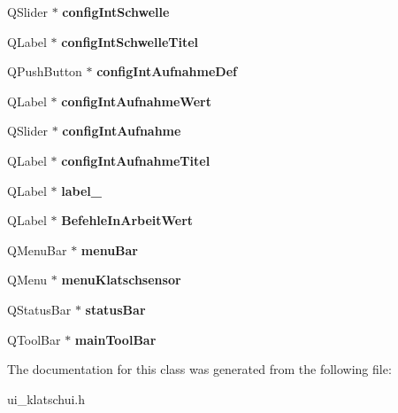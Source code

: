 \begin{DoxyCompactItemize}
\item 
Q\+Slider $\ast$ {\bfseries config\+Int\+Schwelle}\hypertarget{class_ui__klatschui_a73daca54782b978285cedba57e02f071}{}\label{class_ui__klatschui_a73daca54782b978285cedba57e02f071}

\item 
Q\+Label $\ast$ {\bfseries config\+Int\+Schwelle\+Titel}\hypertarget{class_ui__klatschui_aa08824169d30d8f9ee13f4dbb158a5b2}{}\label{class_ui__klatschui_aa08824169d30d8f9ee13f4dbb158a5b2}

\item 
Q\+Push\+Button $\ast$ {\bfseries config\+Int\+Aufnahme\+Def}\hypertarget{class_ui__klatschui_ab66c0fe9fd1385827a31f50492065117}{}\label{class_ui__klatschui_ab66c0fe9fd1385827a31f50492065117}

\item 
Q\+Label $\ast$ {\bfseries config\+Int\+Aufnahme\+Wert}\hypertarget{class_ui__klatschui_abdf48db3c443a83132ee9144d0573480}{}\label{class_ui__klatschui_abdf48db3c443a83132ee9144d0573480}

\item 
Q\+Slider $\ast$ {\bfseries config\+Int\+Aufnahme}\hypertarget{class_ui__klatschui_acf0b144064081db4d375f2fcc08ae91b}{}\label{class_ui__klatschui_acf0b144064081db4d375f2fcc08ae91b}

\item 
Q\+Label $\ast$ {\bfseries config\+Int\+Aufnahme\+Titel}\hypertarget{class_ui__klatschui_a14334201f46e35ecdc1cd61074978685}{}\label{class_ui__klatschui_a14334201f46e35ecdc1cd61074978685}

\item 
Q\+Label $\ast$ {\bfseries label\+\_}\hypertarget{class_ui__klatschui_a8077382b3f93d77f2d6eb40c473e3805}{}\label{class_ui__klatschui_a8077382b3f93d77f2d6eb40c473e3805}

\item 
Q\+Label $\ast$ {\bfseries Befehle\+In\+Arbeit\+Wert}\hypertarget{class_ui__klatschui_a6c4f6eafadc2089ff5eb1f769e184fa5}{}\label{class_ui__klatschui_a6c4f6eafadc2089ff5eb1f769e184fa5}

\item 
Q\+Menu\+Bar $\ast$ {\bfseries menu\+Bar}\hypertarget{class_ui__klatschui_a4c61eeaf10e215e589f094e48ab9de8a}{}\label{class_ui__klatschui_a4c61eeaf10e215e589f094e48ab9de8a}

\item 
Q\+Menu $\ast$ {\bfseries menu\+Klatschsensor}\hypertarget{class_ui__klatschui_aa1dc227cca7eee569e90f07875fcd523}{}\label{class_ui__klatschui_aa1dc227cca7eee569e90f07875fcd523}

\item 
Q\+Status\+Bar $\ast$ {\bfseries status\+Bar}\hypertarget{class_ui__klatschui_aa052a6c753834e52b2ed359ec4c2f474}{}\label{class_ui__klatschui_aa052a6c753834e52b2ed359ec4c2f474}

\item 
Q\+Tool\+Bar $\ast$ {\bfseries main\+Tool\+Bar}\hypertarget{class_ui__klatschui_abeaac8e26de9e737c19eefad8114ddd5}{}\label{class_ui__klatschui_abeaac8e26de9e737c19eefad8114ddd5}

\end{DoxyCompactItemize}


The documentation for this class was generated from the following file\+:\begin{DoxyCompactItemize}
\item 
ui\+\_\+klatschui.\+h\end{DoxyCompactItemize}
